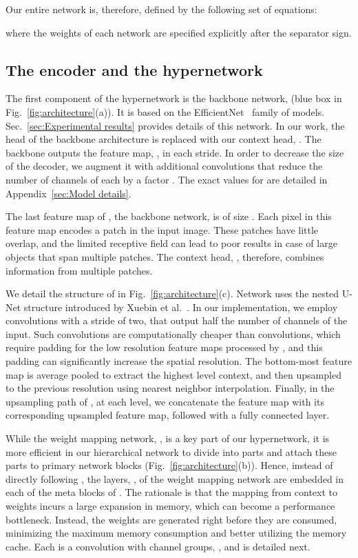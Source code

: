 \documentclass[final]{cvpr}
\begin{document}
Our entire network is, therefore, defined by the following set of equations:

where the weights of each network are specified explicitly after the separator sign.




\subsection{The encoder and the hypernetwork}
\label{subsec:Signal head}
The first component of the hypernetwork is the backbone network,  (blue box in Fig.~\ref{fig:architecture}(a)). It is based on the EfficientNet~\cite{tan2019efficientnet} family of models. Sec.~\ref{sec:Experimental results} provides details of this network. In our work, the head of the backbone architecture is replaced with our context head, . The backbone outputs the feature map, , in each stride. In order to decrease the size of the decoder, we augment it with additional  convolutions that reduce the number of channels of each  by a factor . The exact values for  are detailed in Appendix~\ref{sec:Model details}.

The last feature map of , the backbone network, is of size . Each pixel in this feature map encodes a patch in the input image. These patches have little overlap, and the limited receptive field can lead to poor results in case of large objects that span multiple patches. The context head, , therefore, combines information from multiple patches.




We detail the structure of  in Fig.~\ref{fig:architecture}(c). Network  uses the nested U-Net structure introduced by Xuebin et al.~\cite{qin2020u2}. In our implementation, we employ  convolutions with a stride of two, that output half the number of channels of the input. Such convolutions are computationally cheaper than  convolutions, which require padding for the low resolution feature maps processed by , and this padding can significantly increase the spatial resolution. The bottom-most feature map is average pooled to extract the highest level context, and then upsampled to the previous resolution using nearest neighbor interpolation. Finally, in the upsampling path of , at each level, we concatenate the feature map with its corresponding upsampled feature map, followed with a fully connected layer.

While the weight mapping network, , is a key part of our hypernetwork, it is more efficient in our hierarchical network to divide  into parts and attach these parts to primary network blocks (Fig.~\ref{fig:architecture}(b)). Hence, instead of directly following , the layers, , of the weight mapping network are embedded in each of the meta blocks of . The rationale is that the mapping from context to weights incurs a large expansion in memory, which can become a performance bottleneck. Instead, the weights are generated right before they are consumed, minimizing the maximum memory consumption and better utilizing the memory cache. Each  is a  convolution with channel groups, , and is detailed next.
\end{document}
